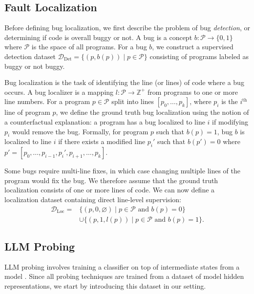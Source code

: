 \subsection{Fault Localization}
\label{sec:localization}
Before defining bug localization, we first describe the problem of bug \textit{detection}, or determining if code is overall buggy or not.
A bug is a concept $b:\mathcal{P}\rightarrow \{0,1\}$ where
$\mathcal{P}$ is the space of all programs.
For a bug $b$, we construct a supervised detection dataset $\mathcal{D}_\text{Det} = \{(p, b(p)) \mid p\in \mathcal{P}\}$ consisting of programs labeled as buggy or not buggy.

Bug localization is the task of identifying the line (or lines) of code where a bug occurs. A bug localizer is a mapping $l:\mathcal{P}\rightarrow \mathbb{Z}^+$ from programs to one or more line numbers.
For a program $p \in \mathcal{P}$ split into lines $[p_0, \dots, p_k]$, where $p_i$ is the $i^\text{th}$ line of program $p$,
we define the ground truth bug localization using the notion of a counterfactual explanation: a program has a bug localized to line $i$ if modifying $p_i$ would remove the bug.
Formally, for program $p$ such that $b(p)=1$, bug $b$ is localized to line $i$ if there exists a modified line $p_i'$ such that $b(p')=0$ where $p'=[p_0, \dots, p_{i-1}, p_i', p_{i+1}, \dots, p_k]$. 

Some bugs require multi-line fixes, in which case changing multiple lines of the program would fix the bug.
We therefore assume that the ground truth localization consists of one or more lines of code. We can now define a localization dataset containing direct line-level supervision:
\begin{align*}
\mathcal{D}_\text{Loc} = &\{(p, 0, \varnothing) \mid p\in\mathcal{P} \text{ and } b(p) = 0\} \\
&\cup \{(p, 1, l(p)) \mid p\in\mathcal{P} \text{ and } b(p) = 1\}.
\end{align*}

\subsection{LLM Probing}
LLM probing involves training a classifier on top of intermediate states from a model \citep{alain2016understanding}.
Since all probing techniques are trained from a dataset of model hidden representations, we start by introducing this dataset in our setting.

